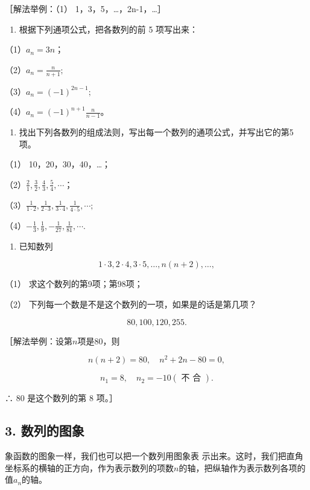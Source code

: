 ［解法举例：（1） 1，3，5，\ldots，2n-1，\ldots］

\begin{enumerate}[start=2]
\item
  根据下列通项公式，把各数列的前 5 项写出来：
\end{enumerate}

（1）\(a_{n} = 3n\)；

（2）\(a_{n} = \frac{n}{n + 1};\)

（3）\(a_{n} = (-1)^{2n - 1};\)

（4）\(a_{n} = (-1)^{n + 1}\frac{n}{n - 1}\)。

\begin{enumerate}[start=3]
\item
  找出下列各数列的组成法则，写出每一个数列的通项公式，并写出它的第5项。
\end{enumerate}

（1） 10，20，30，40，\ldots；

（2）\(\frac{2}{1}, \frac{3}{2}, \frac{4}{3}, \frac{5}{4}, \cdots\)；

（3）\(\frac{1}{1 \cdot 2}, \frac{1}{2 \cdot 3}, \frac{1}{3 \cdot 4}, \frac{1}{4 \cdot 5}, \cdots;\)

（4）\(-\frac{1}{3},\frac{1}{9},-\frac{1}{27},\frac{1}{81},\cdots.\)

\begin{enumerate}[start=4]
\item
  已知数列
\end{enumerate}

\[
1 \cdot 3, 2 \cdot 4, 3 \cdot 5, \dots, n (n + 2), \dots,
\]

（1） 求这个数列的第9项；第98项；

（2） 下列每一个数是不是这个数列的一项，如果是的话是第几项？

\[
80, 100, 120, 255.
\]

［解法举例：设第\(n\)项是80，则

\[
n (n + 2) = 80, \quad n^{2} + 2 n - 80 = 0,
\]

\[
n_{1} = 8, \quad n_{2} = - 10 (\text{ 不 合 }).
\]

∴ 80 是这个数列的第 8 项。］

\subsection{3. 数列的图象}

象函数的图象一样，我们也可以把一个数列用图象表
示出来。这时，我们把直角坐标系的横轴的正方向，作为表示数列的项数\(n\)的轴，把纵轴作为表示数列各项的值\(a_{n}\)的轴。

